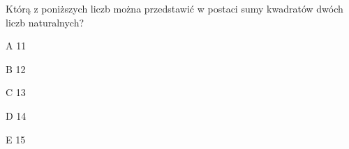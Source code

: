 \begin{tresc}
Którą z poniższych liczb można przedstawić w postaci sumy kwadratów dwóch liczb naturalnych?
\end{tresc}
\begin{wariant}{A} 11 \end{wariant}
\begin{wariant}{B} 12 \end{wariant}
\begin{wariant}{C} 13 \end{wariant}
\begin{wariant}{D} 14 \end{wariant}
\begin{wariant}{E} 15 \end{wariant}

